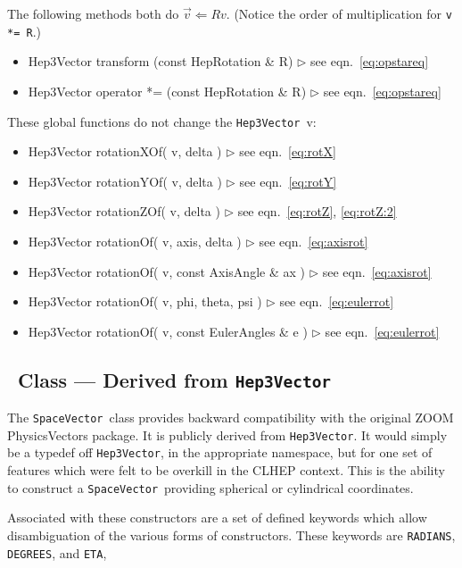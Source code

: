 \documentclass[twoside,12pt]{article}
\def \SV {{\tt Hep3Vector}}
\def \SVz {{\tt SpaceVector}}
\newcommand {\see}[1] {\hfill$\triangleright$ see eqn.~#1}
\newenvironment{shortlist}{%
\begin{itemize}
\setlength{\itemsep}{0pt}
\setlength{\parskip}{0pt}
}{%
\end{itemize}
}
\begin{document}
\noindent 
The following methods both do $\vec{v} \Longleftarrow R v$.  
(Notice the order of multiplication for {\tt v *= R}.)

\begin{shortlist}
  \item Hep3Vector transform   (const HepRotation \& R) \see{\ref{eq:opstareq}}
  \item Hep3Vector operator *= (const HepRotation \& R) \see{\ref{eq:opstareq}}
\end{shortlist}


\noindent
These global functions do not change the \SV\ v:

\begin{shortlist}
  \item Hep3Vector rotationXOf( v, delta ) \see{\ref{eq:rotX}}
  \item Hep3Vector rotationYOf( v, delta ) \see{\ref{eq:rotY}}
  \item Hep3Vector rotationZOf( v, delta ) \see{\ref{eq:rotZ}, \ref{eq:rotZ:2}}
\end{shortlist}

\begin{shortlist}
  \item Hep3Vector rotationOf( v, axis, delta ) \see{\ref{eq:axisrot}}
  \item Hep3Vector rotationOf( v, const AxisAngle \& ax ) \see{\ref{eq:axisrot}}
  \item Hep3Vector rotationOf( v, phi, theta, psi ) \see{\ref{eq:eulerrot}}
  \item Hep3Vector rotationOf( v, const EulerAngles \& e ) \see{\ref{eq:eulerrot}}
\end{shortlist}

\subsection{\protect\SVz\ Class --- Derived from \SV }

The \SVz\ class provides backward compatibility with the original ZOOM
PhysicsVectors package.  
It is publicly derived from \SV .
It would simply be a typedef off \SV , in the appropriate namespace, 
but for one set of features which were felt to be overkill in the 
CLHEP context.  
This is the ability to construct a \SVz\ providing spherical or cylindrical
coordinates.  

Associated with these constructors are a set of defined keywords which
allow disambiguation of the various forms of constructors.  
These keywords are {\tt RADIANS}, {\tt DEGREES}, and {\tt ETA}, 
\end{document}

